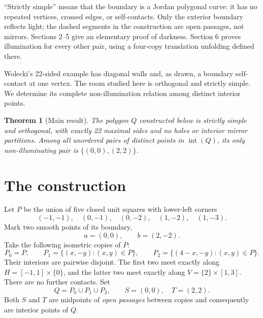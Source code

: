\documentclass[11pt]{article}
\newtheorem{theorem}{Theorem}
\theoremstyle{remark}
\newcommand{\interior}{\operatorname{int}}
\begin{document}
``Strictly simple'' means that the boundary is a Jordan polygonal curve: it has no repeated vertices, crossed edges, or self-contacts. Only the exterior boundary reflects light; the dashed segments in the construction are open passages, not mirrors. Sections 2--5 give an elementary proof of darkness. Section 6 proves illumination for every other pair, using a four-copy translation unfolding defined there.

Wolecki's 22-sided example \cite[Figure~1]{Wolecki2024} has diagonal walls and, as drawn, a boundary self-contact at one vertex. The room studied here is orthogonal and strictly simple. We determine its complete non-illumination relation among distinct interior points.

\begin{theorem}[Main result]\label{thm:main}
The polygon $Q$ constructed below is strictly simple and orthogonal, with exactly 22 maximal sides and no holes or interior mirror partitions. Among all unordered pairs of distinct points in $\interior(Q)$, its only non-illuminating pair is $\{(0,0),(2,2)\}$.
\end{theorem}

\section{The construction}
Let $P$ be the union of five closed unit squares with lower-left corners
\begin{equation}\label{eq:squares}
(-1,-1),\quad(0,-1),\quad(0,-2),\quad(1,-2),\quad(1,-3).
\end{equation}
Mark two smooth points of its boundary,
\begin{equation}\label{eq:ab}
a=(0,0),\qquad b=(2,-2).
\end{equation}
Take the following isometric copies of $P$:
\begin{equation}\label{eq:copies}
P_0=P,\qquad P_1=\{(x,-y):(x,y)\in P\},\qquad
P_2=\{(4-x,-y):(x,y)\in P\}.
\end{equation}
Their interiors are pairwise disjoint. The first two meet exactly along
\(H=[-1,1]\times\{0\}\), and the latter two meet exactly along
\(V=\{2\}\times[1,3]\). There are no further contacts. Set
\[
Q=P_0\cup P_1\cup P_2,\qquad S=(0,0),\quad T=(2,2).
\]
Both $S$ and $T$ are midpoints of \emph{open passages} between copies and consequently are interior points of $Q$.
\end{document}
